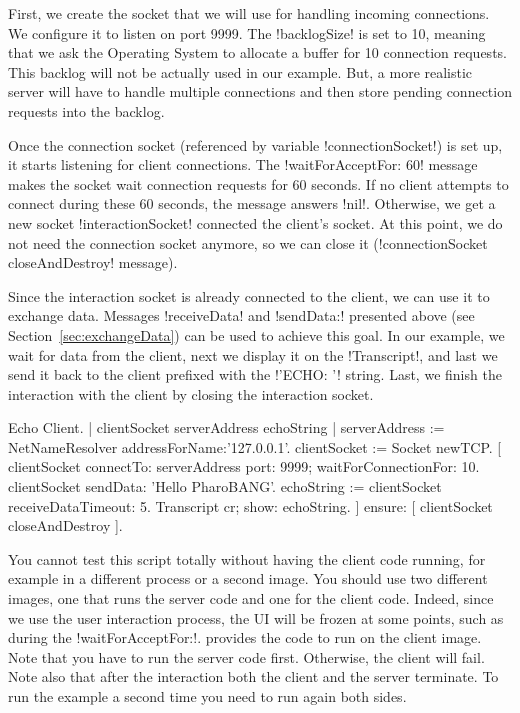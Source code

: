 \documentclass[a4paper,10pt,twoside]{book}
\begin{document}
First, we create the socket that we will use for handling incoming connections.
We configure it to listen on port 9999.
The \ct!backlogSize! is set to 10, meaning that we ask the Operating System to allocate a buffer for 10 connection requests. 
This backlog will not be actually used in our example.
But, a more realistic server will have to handle multiple connections and then store pending connection requests into the backlog.

Once the connection socket (referenced by variable \ct!connectionSocket!) is set up, it starts listening for client connections.
The \ct!waitForAcceptFor: 60! message makes the socket wait connection requests for 60 seconds.
If no client attempts to connect during these 60 seconds, the message answers \ct!nil!.
Otherwise, we get a new socket \ct!interactionSocket! connected the client's socket.
At this point, we do not need the connection socket anymore, so we can close it (\ct!connectionSocket closeAndDestroy! message).

Since the interaction socket is already connected to the client, we can use it to exchange data.
Messages \ct!receiveData! and \ct!sendData:! presented above (see Section~\ref{sec:exchangeData}) can be used to achieve this goal.
In our example, we wait for data from the client, next we display it on the \ct!Transcript!, and last we send it back to the client prefixed with the \ct!'ECHO: '! string.
Last, we finish the interaction with the client by closing the interaction socket.

\begin{script}[echoClient]{Echo Client.}
| clientSocket serverAddress echoString |
serverAddress := NetNameResolver addressForName:'127.0.0.1'.
clientSocket := Socket newTCP.
[ clientSocket 
	connectTo: serverAddress port: 9999;
	waitForConnectionFor: 10.
 clientSocket sendData: 'Hello PharoBANG'.
 echoString  := clientSocket receiveDataTimeout: 5.
 Transcript cr; show: echoString.
] ensure: [ clientSocket closeAndDestroy ].
\end{script}

You cannot test this script totally without having the client code running, for example in a different process or a second image. 
You should use two different images, one that runs the server code and one for the client code. 
Indeed, since we use the user interaction process, the \pharo UI will be frozen at some points, such as during the \ct!waitForAcceptFor:!.
 provides the code to run on the client image.
Note that you have to run the server code first.
Otherwise, the client will fail.
Note also that after the interaction both the client and the server terminate.
To run the example a second time you need to run again both sides.
\end{document}

